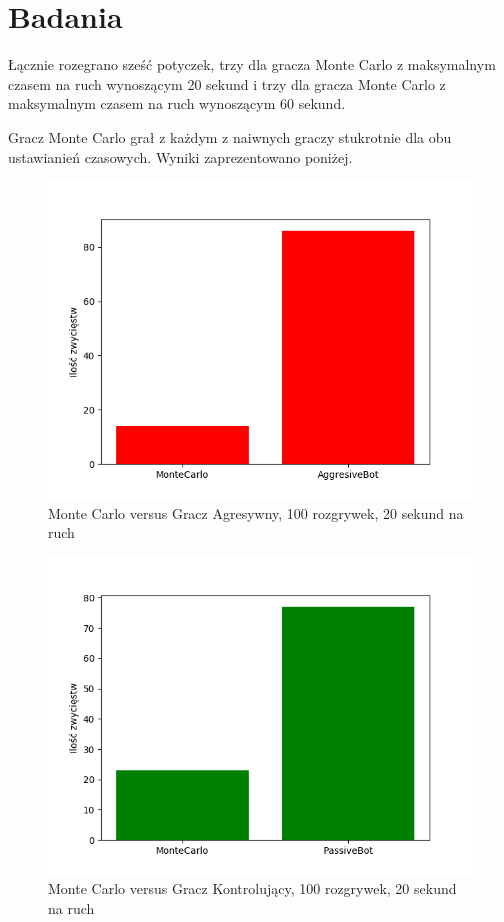 \documentclass[a4paper, 12pt]{article}
\begin{document}
\section{Badania}
Łącznie rozegrano sześć potyczek, trzy dla gracza Monte Carlo z maksymalnym czasem na ruch wynoszącym 20 sekund i trzy dla gracza Monte Carlo z maksymalnym czasem na ruch wynoszącym 60 sekund.

Gracz Monte Carlo grał z każdym z naiwnych graczy stukrotnie dla obu ustawianień czasowych. Wyniki zaprezentowano poniżej. 

\begin{figure}[H]
	\centering
	\includegraphics[scale=0.75]{20-100_a_vs_m.png}
	\caption{Monte Carlo versus Gracz Agresywny, 100 rozgrywek, 20 sekund na ruch}
\end{figure}

\begin{figure}[H]
	\centering
	\includegraphics[scale=0.75]{20-100_p_vs_m.png}
	\caption{Monte Carlo versus Gracz Kontrolujący, 100 rozgrywek, 20 sekund na ruch}
\end{figure}
\end{document}
